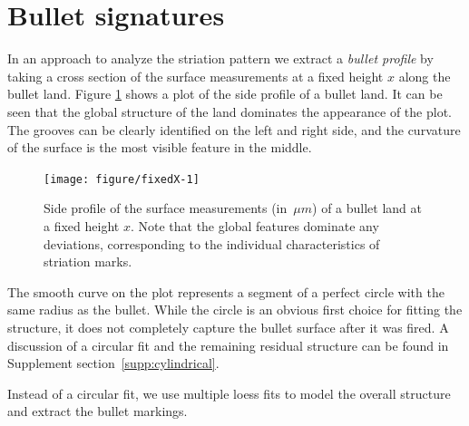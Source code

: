 \documentclass[aoas, preprint]{imsart}\usepackage[]{graphicx}\usepackage[]{color}
\newenvironment{knitrout}{}{} %
\begin{document}
\section{Bullet signatures}

In an approach to analyze the striation pattern we extract a \emph{bullet profile} \citep{ma:2004} by taking a cross section of the surface measurements at a fixed height $x$ along the bullet land.
Figure \ref{fig:fixedX} shows a plot of the side profile of a bullet land. It can be seen that the global structure of the land dominates the appearance of the plot. The grooves can be clearly identified on the left and right side, and the curvature of the surface is the most visible feature in the middle.

\begin{figure}[hbtp]
  \centering
\begin{knitrout}
\color{fgcolor}
\texttt{[image: figure/fixedX-1]} 

\end{knitrout}
\caption{\label{fig:fixedX}Side profile of the surface measurements (in~$\mu m$) of a bullet land at a fixed height $x$. Note that the global features dominate any deviations, corresponding to the individual characteristics of striation marks.}
\end{figure}

The smooth curve on the plot represents a segment of a perfect circle with the same radius as the bullet. While the circle is an obvious first choice for fitting the structure, it does not completely capture the bullet surface after it was fired. A discussion of a circular fit and the remaining residual structure can be found in Supplement section~\ref{supp:cylindrical}.

Instead of a circular fit, we use multiple loess fits to model the overall structure and extract the bullet markings. 
\end{document}
